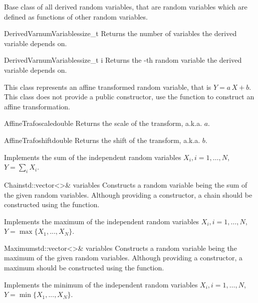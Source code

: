 \documentclass[a4paper, 10pt]{paper}
\begin{document}
Base class of all derived random variables, that are random variables which are defined as functions of other random 
variables.

\begin{defmeth}{DerivedVar}{numVariables}{size\_t}{}
Returns the number of variables the derived variable depends on.
\end{defmeth}

\begin{defmeth}{DerivedVar}{numVariables}{}{size\_t i}
Returns the -th random variable the derived variable depends on.
\end{defmeth}


This class represents an affine transformed random variable, that is $Y = a\,X+b$. This class does not provide a
public constructor, use the  function to construct an affine transformation.

\begin{defmeth}{AffineTrafo}{scale}{double}{}
 Returns the scale of the transform, a.k.a. $a$.
\end{defmeth}

\begin{defmeth}{AffineTrafo}{shift}{double}{}
 Returns the shift of the transform, a.k.a. $b$.
\end{defmeth}


Implements the sum of the independent random variables $X_i, i=1,\dots,N$, $Y = \sum_i X_i$.

\begin{classsyn}{Chain}{std::vector<>\& variables}
Constructs a random variable being the sum of the given random variables. Although providing a constructor, a chain
should be constructed using the  function.
\end{classsyn}


Implements the maximum of the independent random variables $X_i, i=1,\dots,N$, $Y = \max\{X_1,...,X_N\}$.

\begin{classsyn}{Maximum}{std::vector<>\& variables}
Constructs a random variable being the maximum of the given random variables. Although providing a constructor, a maximum
should be constructed using the  function.
\end{classsyn}


Implements the minimum of the independent random variables $X_i, i=1,\dots,N$, $Y = \min\{X_1,...,X_N\}$.
\end{document}
